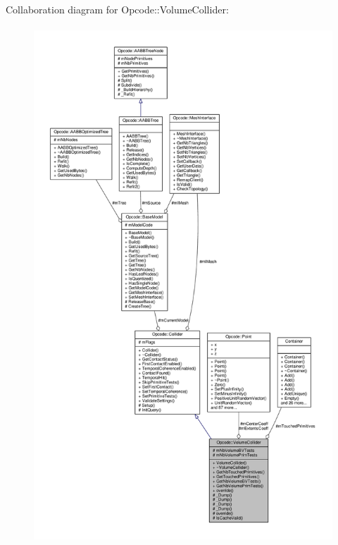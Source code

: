 Collaboration diagram for Opcode\+:\+:Volume\+Collider\+:
\nopagebreak
\begin{figure}[H]
\begin{center}
\leavevmode
\includegraphics[height=550pt]{d8/dfb/classOpcode_1_1VolumeCollider__coll__graph}
\end{center}
\end{figure}
